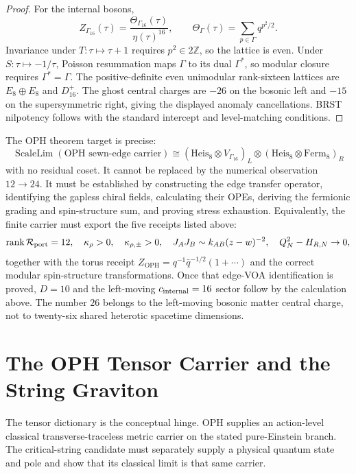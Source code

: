 \documentclass[11pt]{article}
\theoremstyle{remark}
\theoremstyle{plain}
\newcommand{\OPH}{\mathrm{OPH}}
\newcommand{\Z}{\mathbb Z}
\newcommand{\calR}{\mathcal R}
\begin{document}
\begin{proof}
For the internal bosons,
\[
Z_{\Gamma_{16}}(\tau)=\frac{\Theta_{\Gamma_{16}}(\tau)}{\eta(\tau)^{16}},
\qquad
\Theta_\Gamma(\tau)=\sum_{p\in\Gamma}q^{p^2/2}.
\]
Invariance under \(T:\tau\mapsto\tau+1\) requires \(p^2\in2\Z\), so the lattice is even. Under
\(S:\tau\mapsto-1/\tau\), Poisson resummation maps \(\Gamma\) to its dual \(\Gamma^\ast\), so
modular closure requires \(\Gamma^\ast=\Gamma\). The positive-definite even unimodular
rank-sixteen lattices are \(E_8\oplus E_8\) and \(D_{16}^+\). The ghost central charges are
\(-26\) on the bosonic left and \(-15\) on the supersymmetric right, giving the displayed anomaly
cancellations. BRST nilpotency follows with the standard intercept and level-matching conditions.
\end{proof}

The OPH theorem target is precise:
\[
\boxed{
\operatorname{ScaleLim}(\text{OPH sewn-edge carrier})
\cong
\left(\mathrm{Heis}_8\otimes V_{\Gamma_{16}}\right)_L
\otimes
\left(\mathrm{Heis}_8\otimes \mathrm{Ferm}_8\right)_R
}
\]
with no residual coset. It cannot be replaced by the numerical observation \(12\to24\). It must be
established by constructing the edge transfer operator, identifying the gapless chiral fields,
calculating their OPEs, deriving the fermionic grading and spin-structure sum, and proving stress
exhaustion. Equivalently, the finite carrier must export the five receipts listed above:
\[
\operatorname{rank}\calR_{\rm port}=12,\quad
\kappa_\rho>0,\quad
\kappa_{\rho,\pm}>0,\quad
J_AJ_B\sim k_{AB}(z-w)^{-2},\quad
Q_N^2-H_{R,N}\to0,
\]
together with the torus receipt \(Z_{\OPH}=q^{-1}\bar q^{-1/2}(1+\cdots)\) and the correct modular
spin-structure transformations. Once that edge-VOA identification is proved, \(D=10\) and the
left-moving \(c_{\rm internal}=16\) sector follow by the calculation above. The number \(26\)
belongs to the left-moving bosonic matter central charge, not to twenty-six shared heterotic
spacetime dimensions.

\section{The OPH Tensor Carrier and the String Graviton}

The tensor dictionary is the conceptual hinge. OPH supplies an action-level classical
transverse-traceless metric carrier on the stated pure-Einstein branch. The critical-string
candidate must separately supply a physical quantum state and pole and show that its classical
limit is that same carrier.
\end{document}
